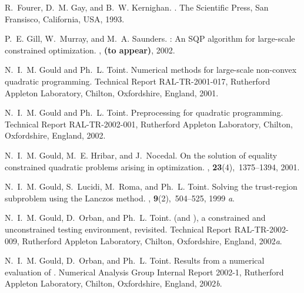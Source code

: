\documentclass[twoside]{article}
\begin{document}
\begin{thebibliography}{xx}
R.~Fourer, D.~M. Gay, and B.~W. Kernighan.
.
\newblock The Scientific Press, San Fransisco, California, USA, 1993.

P.~E. Gill, W.~Murray, and M.~A. Saunders.
: An {SQP} algorithm for large-scale constrained optimization.
, {\bf (to appear)}, 2002.

N.~I.~M. Gould and Ph.~L. Toint.
\newblock Numerical methods for large-scale non-convex quadratic programming.
\newblock Technical Report RAL-TR-2001-017, Rutherford Appleton Laboratory,
  Chilton, Oxfordshire, England, 2001.

N.~I.~M. Gould and Ph.~L. Toint.
\newblock Preprocessing for quadratic programming.
\newblock Technical Report RAL-TR-2002-001, Rutherford Appleton Laboratory,
  Chilton, Oxfordshire, England, 2002.

N.~I.~M. Gould, M.~E. Hribar, and J.~Nocedal.
\newblock On the solution of equality constrained quadratic problems arising in
  optimization.
, {\bf 23}(4),~1375--1394,
  2001.

N.~I.~M. Gould, S.~Lucidi, M.~Roma, and Ph.~L. Toint.
\newblock Solving the trust-region subproblem using the {L}anczos method.
, {\bf 9}(2),~504--525, 1999{\em
  a}.

N.~I.~M. Gould, D.~Orban, and Ph.~L. Toint.
 (and \rm), a constrained and unconstrained
  testing environment, revisited.
\newblock Technical Report RAL-TR-2002-009, Rutherford Appleton Laboratory,
  Chilton, Oxfordshire, England, 2002{\em a}.

N.~I.~M. Gould, D.~Orban, and Ph.~L. Toint.
\newblock Results from a numerical evaluation of  \rm.
\newblock Numerical Analysis Group Internal Report 2002-1, Rutherford Appleton
  Laboratory, Chilton, Oxfordshire, England, 2002{\em b}.


\end{thebibliography}
\end{document}

